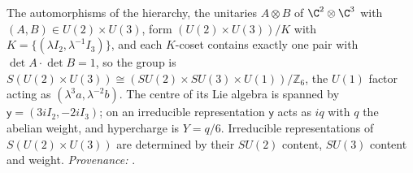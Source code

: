 The automorphisms of the hierarchy, the unitaries $A \otimes B$ of $\C^{2} \otimes \C^{3}$ with $(A, B) \in U(2) \times U(3)$, form $(U(2) \times U(3))/K$ with $K = \{(\lambda I_{2}, \lambda^{-1}I_{3})\}$, and each $K$-coset contains exactly one pair with $\det A \cdot \det B = 1$, so the group is $S(U(2) \times U(3)) \cong (SU(2) \times SU(3) \times U(1))/\mathbb{Z}_{6}$, the $U(1)$ factor acting as $(\lambda^{3}a, \lambda^{-2}b)$. The centre of its Lie algebra is spanned by $\mathsf{y} = (3iI_{2}, -2iI_{3})$; on an irreducible representation $\mathsf{y}$ acts as $iq$ with $q$ the abelian weight, and hypercharge is $Y = q/6$. Irreducible representations of $S(U(2) \times U(3))$ are determined by their $SU(2)$ content, $SU(3)$ content and weight. \emph{Provenance:} \cite[Thms.~4.1, 4.2, and the definition before Prop.~5.3]{ButlerT12}.

